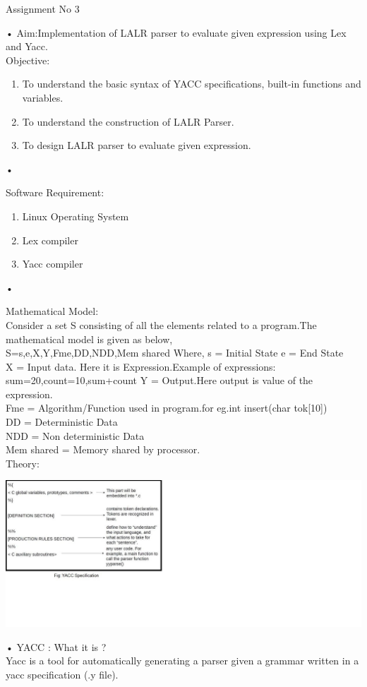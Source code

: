 \documentclass[11pt]{article}
\begin{document}
	\begin{center}
		\begin{Large}
			Assignment No 3
		\end{Large}
	\end{center}•
	Aim:Implementation of LALR parser to evaluate given expression using Lex and Yacc.\\
	
	\noindent
	Objective:
	\begin{enumerate}
		\item To understand the basic syntax of YACC specifications, built-in functions and variables.
		\item To understand the construction of LALR Parser.
		\item To design LALR parser to evaluate given expression.
	\end{enumerate}•
	
	\noindent
	Software Requirement:
	\begin{enumerate}
		\item Linux Operating System
		\item Lex compiler
		\item Yacc compiler
	\end{enumerate}•
	
	\noindent
	Mathematical Model:\\
	Consider a set S consisting of all the elements related to a program.The mathematical model is given as below,\\ S={s,e,X,Y,Fme,DD,NDD,Mem shared} Where, s = Initial State e = End State\\
	X = Input data. Here it is Expression.Example of expressions: sum=20,count=10,sum+count Y = Output.Here output is value of the expression.\\
	Fme = Algorithm/Function used in program.for eg.{int insert(char tok[10])}\\
	DD = Deterministic Data\\
	NDD = Non deterministic Data\\
	Mem shared = Memory shared by processor.\\
	
	\noindent
	Theory:\\
	
	\begin{center}
		\includegraphics{yacc.png}
		
	\end{center}•
	\noindent
	YACC : What it is ?\\
	Yacc is a tool for automatically generating a parser given a grammar written in a yacc specification (.y file).\\
	
\end{document}
